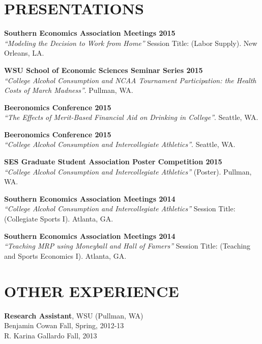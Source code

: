 \documentclass[margin]{res}  %
\begin{document}
\begin{resume}
\section{\textnormal{PRESENTATIONS}}

\textbf{Southern Economics Association Meetings 2015}\\
\emph{``Modeling the Decision to Work from Home''}
Session Title: (Labor Supply). New Orleans, LA. %

\textbf{WSU School of Economic Sciences Seminar Series 2015}\\
\emph{``College Alcohol Consumption and NCAA Tournament Participation: the Health Costs of March Madness''}. Pullman, WA. %

\textbf{Beeronomics Conference 2015}\\
\emph{``The Effects of Merit-Based Financial Aid on Drinking in College''}. Seattle, WA. %

\textbf{Beeronomics Conference 2015}\\
\emph{``College Alcohol Consumption and Intercollegiate Athletics''}. Seattle, WA. %

\textbf{SES Graduate Student Association Poster Competition 2015}\\
\emph{``College Alcohol Consumption and Intercollegiate Athletics''} (Poster). Pullman, WA. %

\textbf{Southern Economics Association Meetings 2014}\\
\emph{``College Alcohol Consumption and Intercollegiate Athletics''}
Session Title: (Collegiate Sports I). Atlanta, GA. %

\textbf{Southern Economics Association Meetings 2014}\\
\emph{``Teaching MRP using Moneyball and Hall of Famers''}
Session Title: (Teaching and Sports Economics I). Atlanta, GA. %


\section{\textnormal{OTHER EXPERIENCE}}

\textbf{Research Assistant}, WSU (Pullman, WA) \\
Benjamin Cowan \hfill Fall, Spring, 2012-13\\
R. Karina Gallardo \hfill Fall, 2013


\end{resume}
\end{document}
